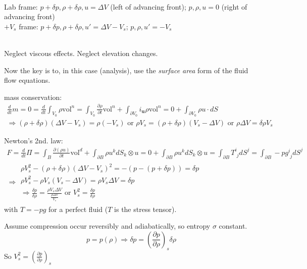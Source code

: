 \documentclass[twoside,landscape,10pt]{amsart}
\theoremstyle{plain}
\theoremstyle{definition}
\theoremstyle{remark}
\theoremstyle{remark}
\begin{document}
\begin{multicols*}{2}
\quad \\ 
Lab frame: $p + \delta p, \rho + \delta \rho, u = \Delta V$ (left of advancing front); $p, \rho, u = 0$ (right of advancing front) \\
$+V_s$ frame: $p+\delta p, \rho + \delta \rho, u' = \Delta V- V_s$; $p, \rho, u' = -V_s$

\quad \\ 
Neglect viscous effects. Neglect elevation changes.

Now the key is to, in this case (analysis), use the \emph{surface area} form of the fluid flow equations.

mass conservation:
\[
\begin{gathered}
\frac{d}{dt} m = 0 = \frac{d}{dt} \int_{V_0} \rho \text{vol}^n = \int_{V_0} \frac{ \partial \rho }{ \partial t} \text{vol}^n + \int_{\partial V_0} i_{\mathbf{u}} \rho \text{vol}^n = 0 + \int_{\partial V_0} \rho u \cdot dS \\ 
\Longrightarrow (\rho + \delta \rho) (\Delta V - V_s) = \rho (-V_s) \text{ or } \rho V_s = (\rho + \delta \rho) (V_s - \Delta V) \text{ or } \rho \Delta V = \delta \rho V_s
\end{gathered}
\]

Newton's 2nd. law:
\[
\begin{gathered}
F = \frac{d}{dt} \Pi = \int_B \frac{ \partial ( \rho u)}{ \partial t} \text{vol}^d + \int_{\partial B} \rho u^k dS_k \otimes u = 0 + \int_{\partial B} \rho u^k dS_k \otimes u = \int_{\partial B} T^i_{ \, \, j } dS^j = \int_{\partial B} - p g^i_{\, \, j} dS^j   \\
\Longrightarrow \begin{gathered}
\rho V_s^2 - (\rho + \delta \rho) (\Delta V - V_s)^2 = - ( p - (p + \delta p)) = \delta p \\ 
\rho V_s^2 - \rho V_s (V_s - \Delta V) = \rho V_s \Delta V = \delta p  \\
\Longrightarrow \frac{ \delta p }{ \delta \rho } = \frac{ \rho V_s \Delta V}{ \frac{ \rho \Delta V}{ V_s} } \text{ or } V_s^2 = \frac{ \delta p}{ \delta \rho} 
\end{gathered}
\end{gathered}
\]
with $T = -pg$ for a perfect fluid ($T$ is the stress tensor).

Assume compression occur reversibly and adiabatically, so entropy $\sigma$ constant. 
\[
p = p(\rho) \Longrightarrow \delta p = \left( \frac{ \partial p}{\partial \rho} \right)_s \delta \rho
\]
So $V_s^2 = \left( \frac{ \partial p }{ \partial \rho} \right)_s$


\end{multicols*}
\end{document}
